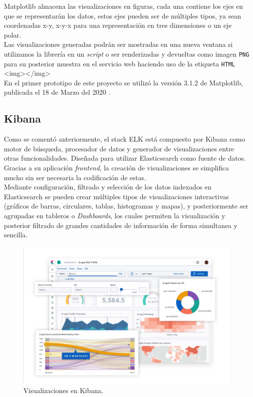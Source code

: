 \documentclass[11pt,a4paper]{book}
\begin{document}
				Matplotlib almacena las visualizaciones en figuras, cada una contiene los ejes en que se representarán los datos, estos ejes pueden ser de múltiples tipos, ya sean coordenadas x-y, x-y-x para una representación en tres dimensiones o un eje polar.\\
							
				Las visualizaciones generadas podrán ser mostradas en una nueva ventana si utilizamos la librería en un \textit{script} o ser renderizadas y devueltas como imagen \texttt{PNG} para su posterior muestra en el servicio web haciendo uso de la etiqueta \texttt{HTML} <img></img>\\
								
				En el primer prototipo de este proyecto se utilizó la versión 3.1.2 de Matplotlib, publicada el 18 de Marzo del 2020 \cite{releases_matplotlib}.
				
			\subsection{Kibana}
				Como se comentó anteriormente, el stack ELK está compuesto por Kibana \cite{kibana} como motor de búsqueda, procesador de datos y generador de visualizaciones entre otras funcionalidades. Diseñada para utilizar Elasticsearch como fuente de datos.\\
				
				Gracias a su aplicación \textit{frontend}, la creación de visualizaciones se simplifica mucho sin ser necesaria la codificación de estas. \\
				
				Mediante configuración, filtrado y selección de los datos indexados en Elasticsearch se pueden crear múltiples tipos de visualizaciones interactivas (gráficos de barras,  circulares, tablas, histogramas y mapas), y posteriormente ser agrupadas en tableros o \textit{Dashboards}, los cuales permiten la visualización y posterior filtrado de grandes cantidades de información de forma simultanea y sencilla.\\
								
				\begin{figure}[H]
					\centering
					\includegraphics[width=12cm, keepaspectratio]{img/visualizations_kibana.png}
					\caption{Visualizaciones en Kibana.}
					\label{fig:visualizations_kibana}
				\end{figure}
\end{document}
